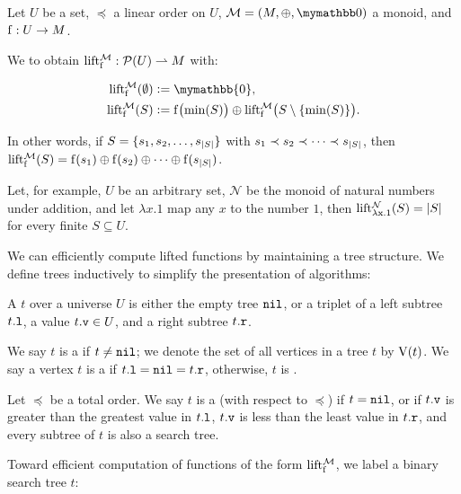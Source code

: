 \documentclass[conference]{IEEEtran}
\begin{document}
\begin{definition}
\label{def-lift}
Let $U$ be a set, $\preceq$ a linear order on $U$, $\mathcal{M} = (M, \groupaddsym, \neutraladd)$ a monoid, and ${\operatorname{f}}: {U} \rightarrow {M}$.

We  to obtain ${\operatorname{lift_{\operatorname{f}}^{\mathcal{M}}}}: {\mathcal{P}({U})} \rightharpoonup{M}$ with:

\begin{align*}
\lift{\f}{\mathcal{M}}(\emptyset) &\defeq \mymathbb{0},\\
\lift{\f}{\mathcal{M}}(S) &\defeq \f\bigl(\min(S)\bigr) \oplus \lift{\f}{\mathcal{M}}\bigl(S \setminus \set{\min(S)}\bigr).\\
\end{align*}

In other words, if $S = \{s_1, s_2, \ldots, s_{|{S}|}\}$ with $s_1 \prec s_2 \prec \cdots \prec s_{|{S}|}$, then $\operatorname{lift_{\operatorname{f}}^{\mathcal{M}}}(S) = {\operatorname{f}(s_1)} \oplus {{\operatorname{f}(s_2)} \oplus{{\cdots} \oplus{\operatorname{f}(s_{|{S}|})}}}$.
\end{definition}

Let, for example, $U$ be an arbitrary set, $\mathcal{N}$ be the monoid of natural numbers under addition, and let $\lambda x.1$ map any $x$ to the number $1$, then $\operatorname{lift_{\lambda x.1}^{\mathcal{N}}}(S) = |{S}|$ for every finite $S \subseteq U$.

We can efficiently compute lifted functions by maintaining a tree structure. We define trees inductively to simplify the presentation of algorithms:

\begin{definition}
A  $t$ over a universe $U$ is either the empty tree $\mathtt{nil}$, or a triplet of a left subtree ${t}\mathtt{.l}$, a value ${t}\mathtt{.v} \in U$, and a right subtree ${t}\mathtt{.r}$.

We say $t$ is a  if $t \neq \mathtt{nil}$; we denote the set of all vertices in a tree $t$ by $\operatorname{V}(t)$. We say a vertex $t$ is a  if ${t}\mathtt{.l} = \mathtt{nil} = {t}\mathtt{.r}$, otherwise, $t$ is .

Let $\preceq$ be a total order. We say $t$ is a  (with respect to $\preceq$) if $t = \mathtt{nil}$, or if ${t}\mathtt{.v}$ is greater than the greatest value in ${t}\mathtt{.l}$, ${t}\mathtt{.v}$ is less than the least value in ${t}\mathtt{.r}$, and every subtree of $t$ is also a search tree.
\end{definition}

Toward efficient computation of functions of the form $\operatorname{lift_{\operatorname{f}}^{\mathcal{M}}}$, we label a binary search tree $t$:
\end{document}
